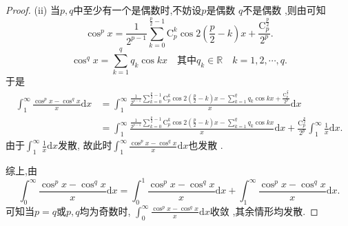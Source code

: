 \documentclass[../../main.tex]{subfiles}
\begin{document}
\begin{proof}
(ii) 当$p,q$中至少有一个是偶数时,不妨设$p$是偶数 $q$不是偶数 ,则由可知  
\[
\cos ^px=\frac{1}{2^{p-1}}\sum_{k=0}^{\frac{p}{2}-1}{\mathrm{C}_{p}^{k}\cos 2\left( \frac{p}{2}-k \right) x}+\frac{\mathrm{C}_{p}^{\frac{p}{2}}}{2^p}.
\]  
\[
\cos ^qx=\sum_{k=1}^q{q_k\cos kx} \quad \text{其中}q_k\in \mathbb{R} \quad k=1,2,\cdots,q.
\] 
于是
\begin{align*}
\int_1^{\infty}{\frac{\cos ^px-\cos ^qx}{x}\mathrm{d}x}&=\int_1^{\infty}{\frac{\frac{1}{2^{p-1}}\sum\limits_{k=0}^{\frac{p}{2}-1}{\mathrm{C}_{p}^{k}\cos 2\left( \frac{p}{2}-k \right) x}-\sum\limits_{k=1}^q{q_k\cos kx}+\frac{\mathrm{C}_{p}^{\frac{p}{2}}}{2^p}}{x}\mathrm{d}x}\\
&=\int_1^{\infty}{\frac{\frac{1}{2^{p-1}}\sum\limits_{k=0}^{\frac{p}{2}-1}{\mathrm{C}_{p}^{k}\cos 2\left( \frac{p}{2}-k \right) x}-\sum\limits_{k=1}^q{q_k\cos kx}}{x}\mathrm{d}x}+\frac{\mathrm{C}_{p}^{\frac{p}{2}}}{2^p}\int_1^{\infty}{\frac{1}{x}\mathrm{d}x}.
\end{align*}  
由于$\int_1^{\infty}{\frac{1}{x}\mathrm{d}x}$发散, 故此时$\int_1^{\infty}{\frac{\cos ^px-\cos ^qx}{x}\mathrm{d}x}$也发散  .

综上,由  
\[
\int_0^{\infty}{\frac{\cos ^px-\cos ^qx}{x}\mathrm{d}x}=\int_0^1{\frac{\cos ^px-\cos ^qx}{x}\mathrm{d}x}+\int_1^{\infty}{\frac{\cos ^px-\cos ^qx}{x}\mathrm{d}x}.
\]
可知当$p=q$或$p,q$均为奇数时, $\int_0^{\infty}{\frac{\cos ^px-\cos ^qx}{x}\mathrm{d}x}$收敛 ,其余情形均发散.
\end{proof}
\end{document}
